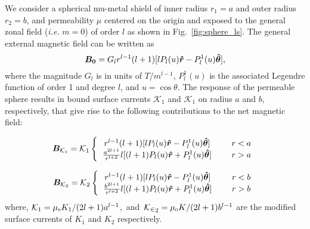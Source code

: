 
We consider a spherical mu-metal shield of inner radius $r_1=a$ and outer radius $r_2=b$, and permeability $\mu$ centered on the origin and exposed to the general zonal field (\textit{i.e.}
$m=0$)
of order $l$ %
as shown in Fig.~\ref{fig:sphere_ls}. The general external magnetic field can be written as~\cite{CB1}
\begin{equation}\label{bo}
\bm{B_0} = G_l r^{l-1} (l+1)[l P_l(u) \bm{\hat{r}} -  P_l^1(u)  \bm{\hat{\theta}} ]{\rm ,}
\end{equation}
where the magnitude $G_l$ is in units of $T/m^{l-1}$, $P_l^1(u)$ is the associated Legendre function of order 1 and degree $l$, and $u=\cos\theta$.  
 The response of the permeable sphere  results in bound surface currents $\mathcal{K}_1$ and $\mathcal{K}_1$ on radius $a$ and $b$, respectively, that give rise to the following contributions to the net magnetic field:


\begin{equation}\label{r=R}
\bm B_{\mathcal{K}_1} =
\mathcal{K}_1
\left \{
  \begin{tabular}{ccc}
  $r^{l-1}(l+1)[l P_l(u)\bm{\hat{r}} -  P_l^1(u) \bm{\hat{\theta}} ]$ &  & $r<a$  \\
  $\frac{a^{2l+1}}{r^{l+2}}
l[(l+1) P_l(u) \bm{\hat{r}} +  P_l^1(u)  \bm{\hat{\theta}} ]$ &  & $r>a$  
  \end{tabular}
\right. 
\end{equation}

\begin{equation}\label{r=R+t}
\bm B_{\mathcal{K}_2} =\mathcal{K}_2
\left \{
  \begin{tabular}{ccc}
  $r^{l-1} (l+1)[l P_l(u)\bm{\hat{r}} -  P_l^1(u)\bm{\hat{\theta}} ]$ &  & $r<b$  \\
  $\frac{b^{2l+1}}{r^{l+2}}l[(l+1) P_l(u)\bm{\hat{r}} +  P_l^1(u) \bm{\hat{\theta}} ]$ &  & $r>b$  
  \end{tabular}
\right.
\end{equation}
where, $\mathcal{K}_1={\mu_{\scriptscriptstyle 0} K_1}/{(2l+1)a^{l-1}}$,~and~$\mathcal{K_2}_2={\mu_{\scriptscriptstyle 0} K}/{(2l+1)b^{l-1}}$ are the modified surface currents of $K_1$ and $K_2$ respectively.

